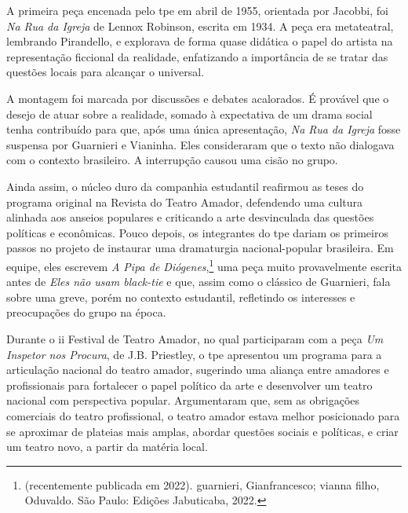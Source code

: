 A primeira peça encenada pelo {\sc tpe} em abril de 1955, orientada por
Jacobbi, foi {\it Na Rua da Igreja} de Lennox Robinson, escrita em
1934. A peça era metateatral, lembrando Pirandello, e explorava de forma
quase didática o papel do artista na representação ficcional da
realidade, enfatizando a importância de se tratar das questões locais
para alcançar o universal.

A montagem foi marcada por discussões e debates acalorados. É provável
que o desejo de atuar sobre a realidade, somado à expectativa de um
drama social tenha contribuído para que, após uma única apresentação,
{\it Na Rua da Igreja} fosse suspensa por Guarnieri e Vianinha. Eles
consideraram que o texto não dialogava com o contexto brasileiro. A
interrupção causou uma cisão no grupo.

Ainda assim, o núcleo duro da companhia estudantil reafirmou as teses do
programa original na Revista do Teatro Amador, defendendo uma cultura
alinhada aos anseios populares e criticando a arte desvinculada das
questões políticas e econômicas. Pouco depois, os integrantes do {\sc tpe}
dariam os primeiros passos no projeto de instaurar uma dramaturgia
nacional-popular brasileira. Em equipe, eles escrevem {\it A Pipa de
Diógenes},\footnote{(recentemente publicada em 2022). {\sc guarnieri},
  Gianfrancesco; {\sc vianna filho}, Oduvaldo. São Paulo: Edições Jabuticaba,
  2022.} uma peça muito provavelmente escrita antes de {\it Eles não
usam black-tie} e que, assim como o clássico de Guarnieri, fala sobre
uma greve, porém no contexto estudantil, refletindo os interesses e
preocupações do grupo na época.

Durante o {\sc ii} Festival de Teatro Amador, no qual participaram com a peça
{\it Um Inspetor nos Procura}, de J.B. Priestley, o {\sc tpe} apresentou um
programa para a articulação nacional do teatro amador, sugerindo uma
aliança entre amadores e profissionais para fortalecer o papel político
da arte e desenvolver um teatro nacional com perspectiva popular.
Argumentaram que, sem as obrigações comerciais do teatro profissional, o
teatro amador estava melhor posicionado para se aproximar de plateias
mais amplas, abordar questões sociais e políticas, e criar um teatro
novo, a partir da matéria local.

